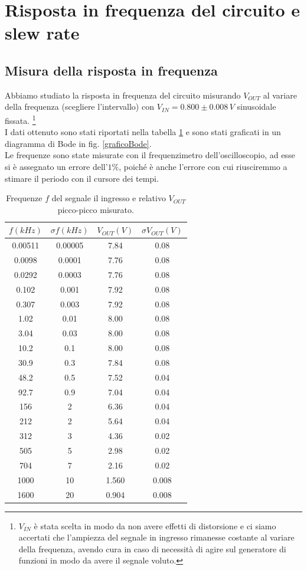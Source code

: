 \documentclass[10pt,a4paper]{article}
\begin{document}
\section{Risposta in frequenza del circuito e slew rate}
\subsection{Misura della risposta in frequenza}

Abbiamo studiato la risposta in frequenza del circuito misurando $V_{OUT}$ al variare della frequenza (scegliere l'intervallo) con $V_{IN}=0.800 \pm 0.008 \, V$  sinusoidale fissata. \footnote{$V_{IN}$ è stata scelta in modo da non avere effetti di distorsione e ci siamo accertati che l'ampiezza del segnale in ingresso rimanesse costante al variare della frequenza, avendo cura in caso di necessità di agire sul generatore di funzioni in modo da avere il segnale voluto.} \\
I dati ottenuto sono stati riportati nella tabella \ref{tabellaBode} e sono stati graficati in un diagramma di Bode in fig. \ref{graficoBode}.\\
Le frequenze sono state misurate con il frequenzimetro dell'oscilloscopio, ad esse si è assegnato un errore dell'$1\%$, poiché è anche l'errore con cui riusciremmo a stimare il periodo con il cursore dei tempi.\\

\begin{table}[!htb]\centering
\begin{tabular}{|c|c|c|c|}
\hline
$f (kHz)$ & $\sigma f (kHz) $ & $ V_{OUT} (V)$ & $\sigma V_{OUT} (V)$\\
\hline
0.00511 & 0.00005 & 7.84 & 0.08\\
0.0098 & 0.0001 & 7.76 & 0.08\\
0.0292 & 0.0003 & 7.76 & 0.08\\
0.102 & 0.001 & 7.92 & 0.08\\
0.307 & 0.003 & 7.92 & 0.08\\
1.02 & 0.01 & 8.00 & 0.08\\
3.04 & 0.03 & 8.00 & 0.08\\
10.2 & 0.1 & 8.00 & 0.08\\
30.9 & 0.3 & 7.84 & 0.08\\
48.2 & 0.5 & 7.52 & 0.04\\
92.7 & 0.9 & 7.04 & 0.04\\
156 & 2 & 6.36 & 0.04\\
212 & 2 & 5.64 & 0.04\\
312 & 3 & 4.36 & 0.02\\
505 & 5 & 2.98 & 0.02\\
704 & 7 & 2.16 & 0.02\\
1000 & 10 & 1.560 & 0.008\\
1600 & 20 & 0.904 & 0.008\\
\hline
\end{tabular}
\caption{Frequenze $f$ del segnale il ingresso e relativo $V_{OUT}$ picco-picco misurato.}
\label{tabellaBode}
\end{table}
\end{document}
